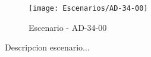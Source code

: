 \begin{figure}[H]
\centering
\texttt{[image: Escenarios/AD-34-00]}
\caption{Escenario - AD-34-00}
\label{fig:AD-34-00}
\end{figure}

Descripcion escenario...
\clearpage
